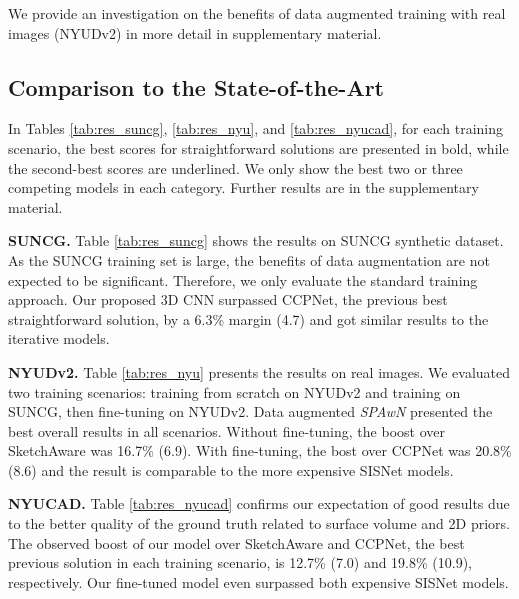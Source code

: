 We provide an investigation on the benefits of data augmented  training with real images (NYUDv2) in more detail in supplementary material.

\subsection{Comparison to the State-of-the-Art}
In Tables \ref{tab:res_suncg}, \ref{tab:res_nyu}, and \ref{tab:res_nyucad}, 
for each training scenario, the best scores for straightforward solutions are presented in bold, 
while the second-best scores are underlined. 
We only show the best two or three competing models in each category. Further results are in the supplementary material.


\textbf{SUNCG.} Table \ref{tab:res_suncg} shows the results on SUNCG synthetic dataset. As the SUNCG training set is large, the benefits of data augmentation  are not expected to be significant. Therefore, we only evaluate the standard training  approach. Our proposed 3D CNN surpassed CCPNet, the previous best straightforward solution, by a 6.3\% margin (\SI{4.7}{\pp}) and got similar results to the iterative models.


\textbf{NYUDv2.} Table \ref{tab:res_nyu} presents the results on real images. We evaluated two training scenarios: training from scratch on NYUDv2 and training on SUNCG, then fine-tuning on NYUDv2. Data augmented \emph{SPAwN} presented the best overall results in all scenarios. Without fine-tuning, the boost over SketchAware was  16.7\% (\SI{6.9}{\pp}). With fine-tuning, the bost over CCPNet was 20.8\%  (\SI{8.6}{\pp}) and the result is comparable to the more expensive SISNet models.


\textbf{NYUCAD.} Table \ref{tab:res_nyucad} confirms our expectation of good results due to the better quality of the ground truth related to surface volume and 2D priors. The observed  boost of our model over SketchAware and CCPNet, the best previous solution in each training scenario, is 12.7\% (\SI{7.0}{\pp}) and 19.8\% (\SI{10.9}{\pp}), respectively. Our fine-tuned model even surpassed both expensive SISNet models.



